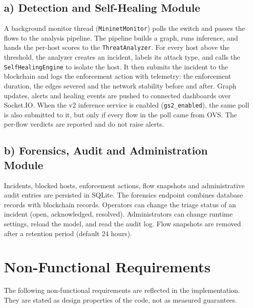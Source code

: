 \documentclass[12pt,a4paper]{report}
\begin{document}
\subsection*{a) Detection and Self-Healing Module}

A background monitor thread (\texttt{MininetMonitor}) polls the switch and passes the flows to the analysis pipeline. The pipeline builds a graph, runs inference, and hands the per-host scores to the \texttt{ThreatAnalyzer}. For every host above the threshold, the analyzer creates an incident, labels its attack type, and calls the \texttt{SelfHealingEngine} to isolate the host. It then submits the incident to the blockchain and logs the enforcement action with telemetry: the enforcement duration, the edges severed and the network stability before and after. Graph updates, alerts and healing events are pushed to connected dashboards over Socket.IO. When the v2 inference service is enabled (\texttt{gs2\_enabled}), the same poll is also submitted to it, but only if every flow in the poll came from OVS. The per-flow verdicts are reported and do not raise alerts.

\subsection*{b) Forensics, Audit and Administration Module}

Incidents, blocked hosts, enforcement actions, flow snapshots and administrative audit entries are persisted in SQLite. The forensics endpoint combines database records with blockchain records. Operators can change the triage status of an incident (open, acknowledged, resolved). Administrators can change runtime settings, reload the model, and read the audit log. Flow snapshots are removed after a retention period (default 24 hours).


\section{Non-Functional Requirements}

The following non-functional requirements are reflected in the implementation. They are stated as design properties of the code, not as measured guarantees.
\end{document}
